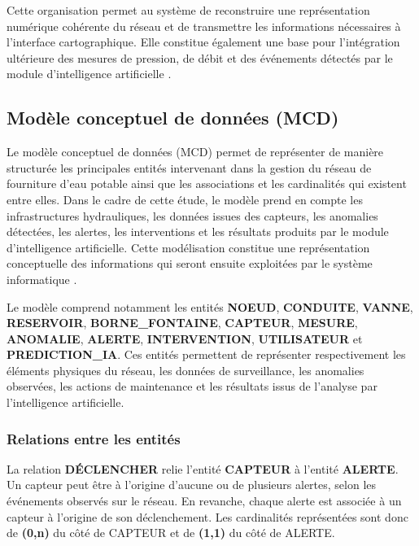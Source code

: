 Cette organisation permet au système de reconstruire une représentation
numérique cohérente du réseau et de transmettre les informations
nécessaires à l'interface cartographique. Elle constitue également une
base pour l'intégration ultérieure des mesures de pression, de débit et
des événements détectés par le module d'intelligence artificielle
\cite{ref132}.

\subsection{Modèle conceptuel de données (MCD)}
\label{modele-conceptuel-de-donnees}

Le modèle conceptuel de données (MCD) permet de représenter de manière
structurée les principales entités intervenant dans la gestion du réseau
de fourniture d'eau potable ainsi que les associations et les cardinalités
qui existent entre elles. Dans le cadre de cette étude, le modèle prend
en compte les infrastructures hydrauliques, les données issues des
capteurs, les anomalies détectées, les alertes, les interventions et les
résultats produits par le module d'intelligence artificielle. Cette
modélisation constitue une représentation conceptuelle des informations
qui seront ensuite exploitées par le système informatique \cite{ref105}.

Le modèle comprend notamment les entités \textbf{NOEUD},
\textbf{CONDUITE}, \textbf{VANNE}, \textbf{RESERVOIR},
\textbf{BORNE\_FONTAINE}, \textbf{CAPTEUR}, \textbf{MESURE},
\textbf{ANOMALIE}, \textbf{ALERTE}, \textbf{INTERVENTION},
\textbf{UTILISATEUR} et \textbf{PREDICTION\_IA}. Ces entités permettent
de représenter respectivement les éléments physiques du réseau, les
données de surveillance, les anomalies observées, les actions de
maintenance et les résultats issus de l'analyse par l'intelligence
artificielle.

\subsubsection{Relations entre les entités}

La relation \textbf{DÉCLENCHER} relie l'entité \textbf{CAPTEUR} à
l'entité \textbf{ALERTE}. Un capteur peut être à l'origine d'aucune ou de
plusieurs alertes, selon les événements observés sur le réseau. En
revanche, chaque alerte est associée à un capteur à l'origine de son
déclenchement. Les cardinalités représentées sont donc de
\textbf{(0,n)} du côté de CAPTEUR et de \textbf{(1,1)} du côté de ALERTE.

